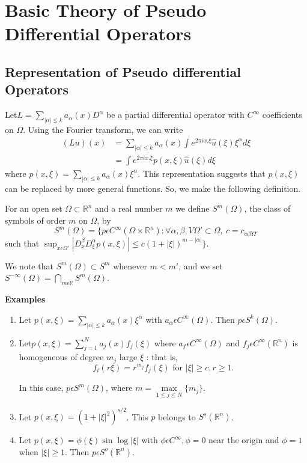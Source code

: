 \chapter{Basic Theory of Pseudo Differential Operators}\label{chap4}

\section{Representation of Pseudo differential Operators}\label{chap4:sec1}

Let\pageoriginale $L = \sum \limits_{|\alpha | \le k} a_\alpha (x)D^\alpha $ be a
partial differential operator with $C^\infty$ coefficients on
$\Omega$. Using the Fourier transform, we can write 
\begin{align*}
(Lu)(x) & = \sum_{|\alpha| \le k}  a_\alpha (x) \int e^{2 \pi
    ix.\xi}\hat{u}(\xi)\xi^\alpha d \xi\\ 
  & = \int e^{2 \pi ix. \xi}p(x, \xi)\hat{u}(\xi)d \xi
\end{align*}
where $p(x, \xi)= \sum\limits_{|\alpha| \le k}  a_\alpha (x)
\xi^\alpha$. This representation suggests that $p(x,\xi)$ can be
replaced by more general functions. So, we make the following
definition. 

\begin{defi}\label{chap4:sec1:def4.1}
  For an open set $\Omega \subset \mathbb{R}^n$ and a real number $m$ we
  define $S^m(\Omega)$, the class of symbols of order $m$ on $\Omega$,
  by 
  $$
  S^m(\Omega)= \{p \epsilon C^\infty(\Omega \times \mathbb{R}^n) :
  \forall \alpha, \beta, V \Omega' \subset \Omega, ~c=c_{\alpha \beta
    \Omega'} 
  $$
  such that  $\sup_{x \epsilon \Omega'}  |D^\beta_x D^\alpha_\xi p(x,
  \xi)| \le c (1+| \xi |)^{m-|\alpha|}\}$. 
\end{defi}

We note that $S^m(\Omega) \subset S^m$ whenever  $m < m'$, and we set
$S^{- \infty}(\Omega)= \bigcap \limits_{m \epsilon \mathbb{R}}
S^m(\Omega)$.

\medskip 
\noindent \textbf{Examples}
  \begin{enumerate}[\rm (i)]
  \item Let $p(x,\xi)=\sum\limits_{|\alpha|\le k} a_\alpha(x)\xi^\alpha
  $ with $a_\alpha \epsilon C^\infty (\Omega)$. Then $p \epsilon
  S^k (\Omega)$. 
\item Let\pageoriginale $p(x,\xi) = \sum\limits^{N}_{j=1} a_j (x) f_j(\xi)$ where
  $a_f \epsilon  C^\infty (\Omega)$ and $f_j \epsilon C^\infty
  (\mathbb{R}^n)$ is homogeneous of degree $m_j$ large $\xi $ : that
  is, 
  $$
  f_i(r \xi)=r^{m_j} f_j(\xi) \text{ for } |\xi| \ge c, r \ge 1.
  $$

  In this case, $p \epsilon S^m(\Omega)$, where $m= \max\limits_{1 \le j \le 
    N}\{m_j\}$.  
\item Let $p(x,\xi) = (1+| \xi |^2)^{s/2}$. This $p$ belongs to
  $S^s(\mathbb{R}^n)$. 
\item Let $p(x,\xi)= \phi(\xi) \sin \log |\xi|$ with $\phi \epsilon
  C^\infty,  \phi =0$ near the origin and $\phi =1$ when $|\xi| \ge
  1$. Then $p \epsilon S^o (\mathbb{R}^n)$. 
\end{enumerate}

